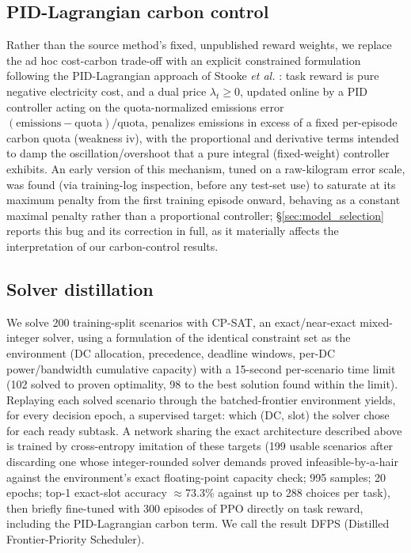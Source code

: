\documentclass[journal]{IEEEtran}
\begin{document}
\subsection{PID-Lagrangian carbon control}
Rather than the source method's fixed, unpublished reward weights, we replace the ad hoc cost-carbon trade-off with an explicit constrained formulation following the PID-Lagrangian approach of Stooke \textit{et al.} \cite{stooke2020}: task reward is pure negative electricity cost, and a dual price $\lambda_t \geq 0$, updated online by a PID controller acting on the quota-normalized emissions error $(\text{emissions} - \text{quota})/\text{quota}$, penalizes emissions in excess of a fixed per-episode carbon quota (weakness iv), with the proportional and derivative terms intended to damp the oscillation/overshoot that a pure integral (fixed-weight) controller exhibits. An early version of this mechanism, tuned on a raw-kilogram error scale, was found (via training-log inspection, before any test-set use) to saturate at its maximum penalty from the first training episode onward, behaving as a constant maximal penalty rather than a proportional controller; \S\ref{sec:model_selection} reports this bug and its correction in full, as it materially affects the interpretation of our carbon-control results.

\subsection{Solver distillation}
\label{sec:distillation}
We solve 200 training-split scenarios with CP-SAT, an exact/near-exact mixed-integer solver, using a formulation of the identical constraint set as the environment (DC allocation, precedence, deadline windows, per-DC power/bandwidth cumulative capacity) with a 15-second per-scenario time limit (102 solved to proven optimality, 98 to the best solution found within the limit). Replaying each solved scenario through the batched-frontier environment yields, for every decision epoch, a supervised target: which (DC, slot) the solver chose for each ready subtask. A network sharing the exact architecture described above is trained by cross-entropy imitation of these targets (199 usable scenarios after discarding one whose integer-rounded solver demands proved infeasible-by-a-hair against the environment's exact floating-point capacity check; 995 samples; 20 epochs; top-1 exact-slot accuracy $\approx$73.3\% against up to 288 choices per task), then briefly fine-tuned with 300 episodes of PPO directly on task reward, including the PID-Lagrangian carbon term. We call the result DFPS (Distilled Frontier-Priority Scheduler).
\end{document}
